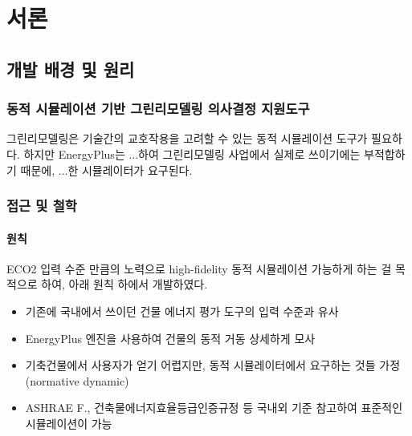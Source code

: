 \part{서론}
\label{part:introduction}


\chapter{개발 배경 및 원리}

\section{동적 시뮬레이션 기반 그린리모델링 의사결정 지원도구}

 그린리모델링은 기술간의 교호작용을 고려할 수 있는 동적 시뮬레이션 도구가 필요하다.
 하지만 EnergyPlus는 ...하여 그린리모델링 사업에서 실제로 쓰이기에는 부적합하기 때문에, ...한 시뮬레이터가 요구된다.


\section{ 접근 및 철학}

\subsection{원칙}
ECO2 입력 수준 만큼의 노력으로 high-fidelity 동적 시뮬레이션 가능하게 하는 걸 목적으로 하여, 아래 원칙 하에서 개발하였다.

\begin{itemize}
  \item 기존에 국내에서 쓰이던 건물 에너지 평가 도구의 입력 수준과 유사
  \item EnergyPlus 엔진을 사용하여 건물의 동적 거동 상세하게 모사
  \item 기축건물에서 사용자가 얻기 어렵지만, 동적 시뮬레이터에서 요구하는 것들 가정 (normative dynamic)
  \item ASHRAE F., 건축물에너지효율등급인증규정 등 국내외 기준 참고하여 표준적인 시뮬레이션이 가능
\end{itemize}

